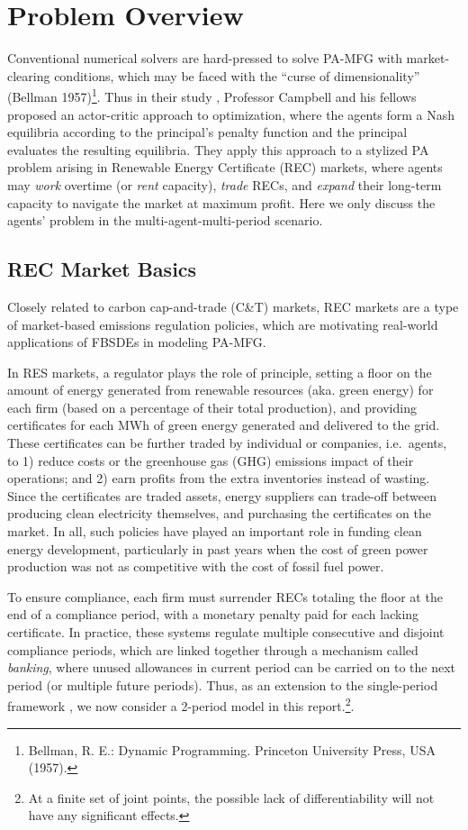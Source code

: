 \documentclass[a4paper,10pt]{article}
\newcommand{\1}{\mathbf{1}}
\begin{document}
\section{Problem Overview}

Conventional numerical solvers are hard-pressed to solve PA-MFG with
market-clearing conditions, which may be faced with the ``curse of
dimensionality'' (Bellman 1957)\footnote{Bellman, R. E.: Dynamic
  Programming. Princeton University Press, USA (1957).}. Thus in their
study \cite{SC}, Professor Campbell and his fellows proposed an actor-critic approach to optimization, where the agents form a Nash equilibria according to the principal's penalty function and the principal evaluates the resulting equilibria. They apply this approach to a stylized PA problem
arising in Renewable Energy Certificate (REC) markets, where agents may
\emph{work} overtime (or \emph{rent} capacity), \emph{trade} RECs, and
\emph{expand} their long-term capacity to navigate the market at maximum
profit. Here we only discuss the agents' problem in the
multi-agent-multi-period scenario.

\subsection{REC Market Basics}

Closely related to carbon cap-and-trade (C\&T) markets, REC markets are
a type of market-based emissions regulation policies, which are
motivating real-world applications of FBSDEs in modeling PA-MFG.

In RES markets, a regulator plays the role of principle, setting a floor
on the amount of energy generated from renewable resources (aka. green
energy) for each firm (based on a percentage of their total production),
and providing certificates for each MWh of green energy generated and
delivered to the grid. These certificates can be further traded by
individual or companies, i.e.~agents, to 1) reduce costs or the
greenhouse gas (GHG) emissions impact of their operations; and 2) earn
profits from the extra inventories instead of wasting. Since the
certificates are traded assets, energy suppliers can trade-off between
producing clean electricity themselves, and purchasing the certificates
on the market. In all, such policies have played an important role in
funding clean energy development, particularly in past years when the
cost of green power production was not as competitive with the cost of
fossil fuel power.

To ensure compliance, each firm must surrender RECs totaling the floor
at the end of a compliance period, with a monetary penalty paid for each
lacking certificate. In practice, these systems regulate multiple
consecutive and disjoint compliance periods, which are linked together
through a mechanism called \emph{banking}, where unused allowances in
current period can be carried on to the next period (or multiple future
periods). Thus, as an extension to the single-period framework \cite{SC}, we
now consider a 2-period model in this report.\footnote{At a finite set
  of joint points, the possible lack of differentiability will not have
  any significant effects.}.
\end{document}
